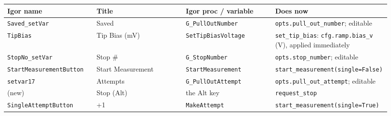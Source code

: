 \small\setlength{\LTleft}{0pt}\setlength{\LTright}{\fill}
\begin{longtable}{@{}>{\raggedright\arraybackslash}p{0.230\linewidth}>{\raggedright\arraybackslash}p{0.230\linewidth}>{\raggedright\arraybackslash}p{0.230\linewidth}>{\raggedright\arraybackslash}p{0.230\linewidth}@{}}
\toprule
\textbf{Igor name} & \textbf{Title} & \textbf{Igor proc / variable} & \textbf{Does now} \\
\midrule\endhead
\texttt{Saved\_\discretionary{}{}{}set\discretionary{}{}{}Var} & Saved & \texttt{G\_\discretionary{}{}{}Pull\discretionary{}{}{}Out\discretionary{}{}{}Number} & \texttt{opts.\discretionary{}{}{}pull\_\discretionary{}{}{}out\_\discretionary{}{}{}number}; editable \\
\texttt{Tip\discretionary{}{}{}Bias} & Tip Bias (mV) & \texttt{Set\discretionary{}{}{}Tip\discretionary{}{}{}Bias\discretionary{}{}{}Voltage} & \texttt{set\_\discretionary{}{}{}tip\_\discretionary{}{}{}bias}: \texttt{cfg.\discretionary{}{}{}ramp.\discretionary{}{}{}bias\_\discretionary{}{}{}v} (V), applied immediately \\
\texttt{Stop\discretionary{}{}{}No\_\discretionary{}{}{}set\discretionary{}{}{}Var} & Stop \# & \texttt{G\_\discretionary{}{}{}Stop\discretionary{}{}{}Number} & \texttt{opts.\discretionary{}{}{}stop\_\discretionary{}{}{}number}; editable \\
\texttt{Start\discretionary{}{}{}Measurement\discretionary{}{}{}Button} & Start Measurement & \texttt{Start\discretionary{}{}{}Measurement} & \texttt{start\_\discretionary{}{}{}measurement(single=False)} \\
\texttt{setvar17} & Attempts & \texttt{G\_\discretionary{}{}{}Pull\discretionary{}{}{}Out\discretionary{}{}{}Attempt} & \texttt{opts.\discretionary{}{}{}pull\_\discretionary{}{}{}out\_\discretionary{}{}{}attempt}; editable \\
(new) & Stop (Alt) & the Alt key & \texttt{request\_\discretionary{}{}{}stop} \\
\texttt{Single\discretionary{}{}{}Attempt\discretionary{}{}{}Button} & +1 & \texttt{Make\discretionary{}{}{}Attempt} & \texttt{start\_\discretionary{}{}{}measurement(single=True)} \\
\bottomrule
\end{longtable}
\normalsize

